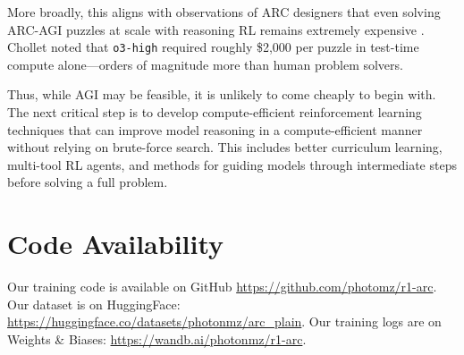 \documentclass{article}
\begin{document}
More broadly, this aligns with observations of ARC designers that even solving ARC-AGI puzzles at scale with reasoning RL remains extremely expensive \cite{Knoop}. Chollet noted that \texttt{o3-high} required roughly \$2,000 per puzzle in test-time compute alone—orders of magnitude more than human problem solvers.

Thus, while AGI may be feasible, it is unlikely to come cheaply to begin with. The next critical step is to develop compute-efficient reinforcement learning techniques that can improve model reasoning in a compute-efficient manner without relying on brute-force search. This includes better curriculum learning, multi-tool RL agents, and methods for guiding models through intermediate steps before solving a full problem.




\appendix
\label{app}

\section{Code Availability}
\label{app:A}
Our training code is available on GitHub \url{https://github.com/photomz/r1-arc}. Our dataset is on HuggingFace: \url{https://huggingface.co/datasets/photonmz/arc_plain}. Our training logs are on Weights \& Biases: \url{https://wandb.ai/photonmz/r1-arc}.
\end{document}
